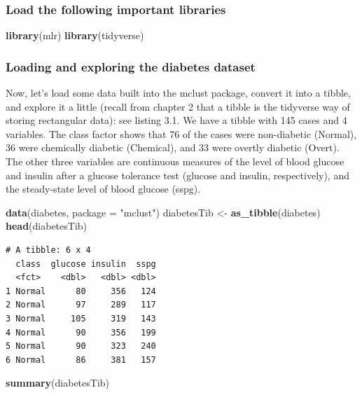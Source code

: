 \documentclass[
]{article}
\newenvironment{Shaded}{\begin{snugshade}}{\end{snugshade}}
\newcommand{\AttributeTok}[1]{\textcolor[rgb]{0.13,0.29,0.53}{#1}}
\newcommand{\FunctionTok}[1]{\textcolor[rgb]{0.13,0.29,0.53}{\textbf{#1}}}
\newcommand{\NormalTok}[1]{#1}
\newcommand{\OtherTok}[1]{\textcolor[rgb]{0.56,0.35,0.01}{#1}}
\newcommand{\StringTok}[1]{\textcolor[rgb]{0.31,0.60,0.02}{#1}}
\begin{document}
\subsubsection{Load the following important
libraries}\label{load-the-following-important-libraries}

\begin{Shaded}
\begin{Highlighting}[]
\FunctionTok{library}\NormalTok{(mlr)}
\FunctionTok{library}\NormalTok{(tidyverse)}
\end{Highlighting}
\end{Shaded}

\subsubsection{Loading and exploring the diabetes
dataset}\label{loading-and-exploring-the-diabetes-dataset}

Now, let's load some data built into the mclust package, convert it into
a tibble, and explore it a little (recall from chapter 2 that a tibble
is the tidyverse way of storing rectangular data): see listing 3.1. We
have a tibble with 145 cases and 4 variables. The class factor shows
that 76 of the cases were non-diabetic (Normal), 36 were chemically
diabetic (Chemical), and 33 were overtly diabetic (Overt). The other
three variables are continuous measures of the level of blood glucose
and insulin after a glucose tolerance test (glucose and insulin,
respectively), and the steady-state level of blood glucose (sspg).

\begin{Shaded}
\begin{Highlighting}[]
\FunctionTok{data}\NormalTok{(diabetes, }\AttributeTok{package =} \StringTok{"mclust"}\NormalTok{)}
\NormalTok{diabetesTib }\OtherTok{\textless{}{-}} \FunctionTok{as\_tibble}\NormalTok{(diabetes)}
\FunctionTok{head}\NormalTok{(diabetesTib)}
\end{Highlighting}
\end{Shaded}

\begin{verbatim}
# A tibble: 6 x 4
  class  glucose insulin  sspg
  <fct>    <dbl>   <dbl> <dbl>
1 Normal      80     356   124
2 Normal      97     289   117
3 Normal     105     319   143
4 Normal      90     356   199
5 Normal      90     323   240
6 Normal      86     381   157
\end{verbatim}

\begin{Shaded}
\begin{Highlighting}[]
\FunctionTok{summary}\NormalTok{(diabetesTib)}
\end{Highlighting}
\end{Shaded}
\end{document}
